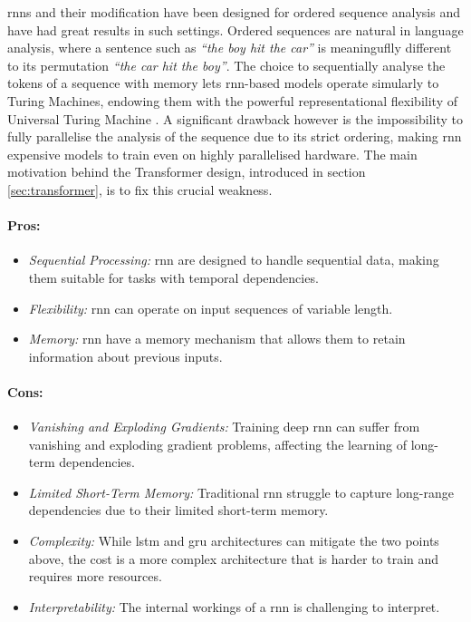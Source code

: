 \gls{rnn}s and their modification have been designed for ordered sequence analysis and have had great results in such settings. Ordered sequences are natural in language analysis, where a sentence such as \textit{``the boy hit the car''} is meaninguflly different to its permutation \textit{``the car hit the boy''}. The choice to sequentially analyse the tokens of a sequence with memory lets \gls{rnn}-based models operate simularly to Turing Machines, endowing them with the powerful representational flexibility of Universal Turing Machine \cite{NEURIPS2021_ef452c63}. A significant drawback however is the impossibility to fully parallelise the analysis of the sequence due to its strict ordering, making \gls{rnn} expensive models to train even on highly parallelised hardware. The main motivation behind the Transformer design, introduced in section \ref{sec:transformer}, is to fix this crucial weakness. \\

\paragraph{Pros:}
\begin{itemize}
    \item \textit{Sequential Processing:} \gls{rnn} are designed to handle sequential data, making them suitable for tasks with temporal dependencies.
    \item \textit{Flexibility:} \gls{rnn} can operate on input sequences of variable length.
    \item \textit{Memory:} \gls{rnn} have a memory mechanism that allows them to retain information about previous inputs.
\end{itemize}

\paragraph{Cons:}
\begin{itemize}
    \item \textit{Vanishing and Exploding Gradients:} Training deep \gls{rnn} can suffer from vanishing and exploding gradient problems, affecting the learning of long-term dependencies.
    \item \textit{Limited Short-Term Memory:} Traditional \gls{rnn} struggle to capture long-range dependencies due to their limited short-term memory. 
    \item \textit{Complexity:} While \gls{lstm} and \gls{gru} architectures can mitigate the two points above, the cost is a more complex architecture that is harder to train and requires more resources. 
    \item \textit{Interpretability:} The internal workings of a \gls{rnn} is challenging to interpret.
\end{itemize}

